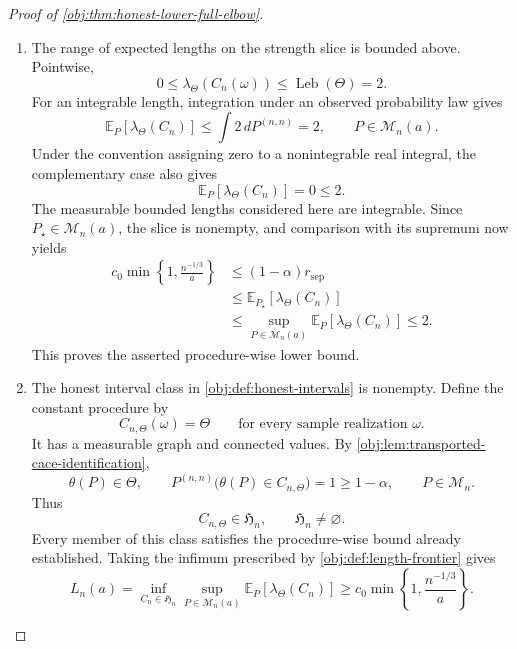 \begin{proof}[Proof of \cref{obj:thm:honest-lower-full-elbow}]
\begin{enumerate}
\item The range of expected lengths on the strength slice is bounded above. Pointwise,
\[
0\le\lambda_{\Theta}(C_n(\omega))
\le\operatorname{Leb}(\Theta)=2.
\]
For an integrable length, integration under an observed probability law gives
\[
\mathbb E_P\!\left[\lambda_{\Theta}(C_n)\right]
\le\int 2\,dP^{(n,n)}=2,
\qquad P\in\mathcal M_n(a).
\]
Under the convention assigning zero to a nonintegrable real integral, the complementary case also gives
\[
\mathbb E_P\!\left[\lambda_{\Theta}(C_n)\right]=0\le2.
\]
The measurable bounded lengths considered here are integrable. Since \(P_{\star}\in\mathcal M_n(a)\), the slice is nonempty, and comparison with its supremum now yields
\[
\begin{aligned}
c_0\min\left\{1,\frac{n^{-1/3}}a\right\}
&\le(1-\alpha)r_{\mathrm{sep}}\\
&\le\mathbb E_{P_{\star}}
       \!\left[\lambda_{\Theta}(C_n)\right]\\
&\le\sup_{P\in\mathcal M_n(a)}
       \mathbb E_P\!\left[\lambda_{\Theta}(C_n)\right]
\le2.
\end{aligned}
\]
This proves the asserted procedure-wise lower bound.

\item The honest interval class in \cref{obj:def:honest-intervals} is nonempty. Define the constant procedure by
\[
C_{n,\Theta}(\omega)=\Theta
\qquad\text{for every sample realization }\omega.
\]
It has a measurable graph and connected values. By \cref{obj:lem:transported-cace-identification},
\[
\theta(P)\in\Theta,
\qquad
P^{(n,n)}\bigl(\theta(P)\in C_{n,\Theta}\bigr)
=1\ge1-\alpha,
\qquad P\in\mathcal M_n.
\]
Thus
\[
C_{n,\Theta}\in\mathfrak H_n,
\qquad
\mathfrak H_n\ne\varnothing.
\]
Every member of this class satisfies the procedure-wise bound already established. Taking the infimum prescribed by \cref{obj:def:length-frontier} gives
\[
L_n(a)
=
\inf_{C_n\in\mathfrak H_n}
\sup_{P\in\mathcal M_n(a)}
\mathbb E_P\!\left[\lambda_{\Theta}(C_n)\right]
\ge
c_0\min\left\{1,\frac{n^{-1/3}}a\right\}.
\]
\end{enumerate}
\end{proof}
